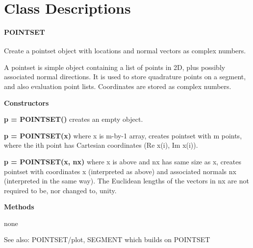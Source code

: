 \appendix

\setlength{\parskip}{\baselineskip}
\setlength{\parindent}{0pt}

\section{Class Descriptions}


\paragraph{POINTSET}

Create a pointset object with locations and normal vectors as
complex numbers.

A pointset is simple object containing a list of points in 2D, plus possibly
associated normal directions.  It is used to store quadrature points on a
segment, and also evaluation point lists. Coordinates are stored as 
complex numbers.

\textbf{Constructors}

\textbf{p = POINTSET()}
creates an empty object.
 
\textbf{p = POINTSET(x)} where x is m-by-1 array, creates pointset with m points, where
the ith point has Cartesian coordinates (Re x(i), Im x(i)).
  
\textbf{p = POINTSET(x, nx)} where x is above and nx has same size as x, creates
pointset with coordinates x (interpreted as above) and associated normals
nx (interpreted in the same way). The Euclidean lengths of the vectors in
nx are not required to be, nor changed to, unity.

\textbf{Methods}

none

See also: POINTSET/plot, SEGMENT which builds on POINTSET



